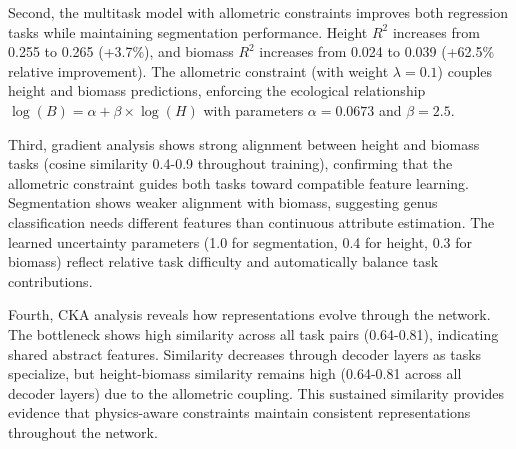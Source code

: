 Second, the multitask model with allometric constraints improves both regression tasks while maintaining segmentation performance. Height $R^2$ increases from 0.255 to 0.265 (+3.7\%), and biomass $R^2$ increases from 0.024 to 0.039 (+62.5\% relative improvement). The allometric constraint (with weight $\lambda = 0.1$) couples height and biomass predictions, enforcing the ecological relationship $\log(B) = \alpha + \beta \times \log(H)$ with parameters $\alpha = 0.0673$ and $\beta = 2.5$.

Third, gradient analysis shows strong alignment between height and biomass tasks (cosine similarity 0.4-0.9 throughout training), confirming that the allometric constraint guides both tasks toward compatible feature learning. Segmentation shows weaker alignment with biomass, suggesting genus classification needs different features than continuous attribute estimation. The learned uncertainty parameters (1.0 for segmentation, 0.4 for height, 0.3 for biomass) reflect relative task difficulty and automatically balance task contributions.

Fourth, CKA analysis reveals how representations evolve through the network. The bottleneck shows high similarity across all task pairs (0.64-0.81), indicating shared abstract features. Similarity decreases through decoder layers as tasks specialize, but height-biomass similarity remains high (0.64-0.81 across all decoder layers) due to the allometric coupling. This sustained similarity provides evidence that physics-aware constraints maintain consistent representations throughout the network.

